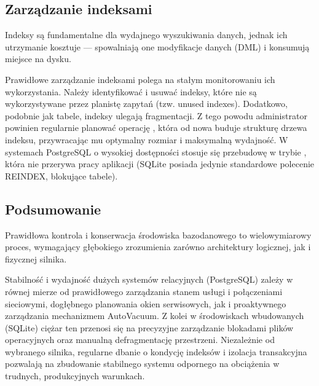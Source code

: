 \documentclass[a4paper,11pt,english,openany,oneside]{sphinxmanual}
\begin{document}
\subsection{Zarządzanie indeksami}
\label{\detokenize{rozdzial_2/rozdzial_23/index:zarzadzanie-indeksami}}
\sphinxAtStartPar
Indeksy są fundamentalne dla wydajnego wyszukiwania danych, jednak ich utrzymanie kosztuje — spowalniają one modyfikacje danych (DML) i konsumują miejsce na dysku.

\sphinxAtStartPar
Prawidłowe zarządzanie indeksami polega na stałym monitorowaniu ich wykorzystania. Należy identyfikować i usuwać indeksy, które nie są wykorzystywane przez planistę zapytań (tzw. unused indexes). Dodatkowo, podobnie jak tabele, indeksy ulegają fragmentacji. Z tego powodu administrator powinien regularnie planować operację , która od nowa buduje strukturę drzewa indeksu, przywracając mu optymalny rozmiar i maksymalną wydajność. W systemach PostgreSQL o wysokiej dostępności stosuje się przebudowę w trybie , która nie przerywa pracy aplikacji (SQLite posiada jedynie standardowe polecenie REINDEX, blokujące tabele).


\subsection{Podsumowanie}
\label{\detokenize{rozdzial_2/rozdzial_23/index:podsumowanie}}
\sphinxAtStartPar
Prawidłowa kontrola i konserwacja środowiska bazodanowego to wielowymiarowy proces, wymagający głębokiego zrozumienia zarówno architektury logicznej, jak i fizycznej silnika.

\sphinxAtStartPar
Stabilność i wydajność dużych systemów relacyjnych (PostgreSQL) zależy w równej mierze od prawidłowego zarządzania stanem usługi i połączeniami sieciowymi, dogłębnego planowania okien serwisowych, jak i proaktywnego zarządzania mechanizmem AutoVacuum. Z kolei w środowiskach wbudowanych (SQLite) ciężar ten przenosi się na precyzyjne zarządzanie blokadami plików operacyjnych oraz manualną defragmentację przestrzeni. Niezależnie od wybranego silnika, regularne dbanie o kondycję indeksów i izolacja transakcyjna pozwalają na zbudowanie stabilnego systemu odpornego na obciążenia w trudnych, produkcyjnych warunkach.

\sphinxstepscope
\end{document}
